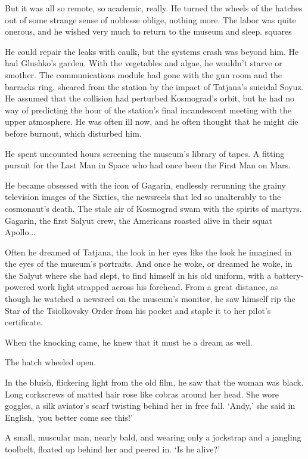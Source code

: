 But it was all so remote, so academic, really. He turned the wheels of the hatches out of some strange sense of noblesse oblige, nothing more. The labor was quite onerous, and he wished very much to return to the museum and sleep.
squares

He could repair the leaks with caulk, but the systems crash was beyond him. He had Glushko's garden. With the vegetables and algae, he wouldn't starve or smother. The communications module had gone with the gun room and the barracks ring, sheared from the station by the impact of Tatjana's suicidal Soyuz. He assumed that the collision had perturbed Kosmograd's orbit, but he had no way of predicting the hour of the station's final incandescent meeting with the upper atmosphere. He was often ill now, and he often thought that he might die before burnout, which disturbed him.

He spent uncounted hours screening the museum's library of tapes. A fitting pursuit for the Last Man in Space who had once been the First Man on Mars.

He became obsessed with the icon of Gagarin, endlessly rerunning the grainy television images of the Sixties, the newsreels that led so unalterably to the cosmonaut's death. The stale air of Kosmograd swam with the spirits of martyrs. Gagarin, the first Salyut crew, the Americans roasted alive in their squat Apollo...

Often he dreamed of Tatjana, the look in her eyes like the look he imagined in the eyes of the museum's portraits. And once he woke, or dreamed he woke, in the Salyut where she had slept, to find himself in his old uniform, with a battery-powered work light strapped across his forehead. From a great distance, as though he watched a newsreel on the museum's monitor, he saw himself rip the Star of the Tsiolkovsky Order from his pocket and staple it to her pilot's certificate.

When the knocking came, he knew that it must be a dream as well.

The hatch wheeled open.

In the bluish, flickering light from the old film, he saw that the woman was black. Long corkscrews of matted hair rose like cobras around her head. She wore goggles, a silk aviator's scarf twisting behind her in free fall. `Andy,' she said in English, `you better come see this!'

A small, muscular man, nearly bald, and wearing only a jockstrap and a jangling toolbelt, floated up behind her and peered in. `Is he alive?'

